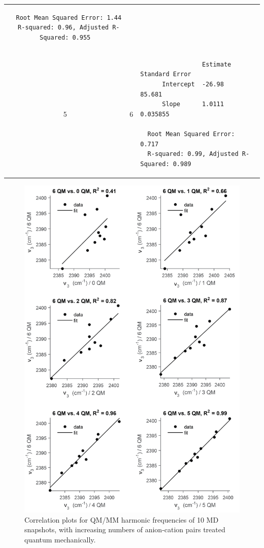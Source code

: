 \documentclass[%
  class = book,%
  crop = false,%
  float = true,%
  multi = true,%
  preview = false,%
]{standalone}
\begin{document}
\begin{table}
\begin{tabular}{ccl}
\begin{minipage}{4.5in}
\begin{verbatim}
  Root Mean Squared Error: 1.44
  R-squared: 0.96, Adjusted R-Squared: 0.955
\end{verbatim}
            \end{minipage} \\
    5 & 6 &
            \begin{minipage}{4.5in}
\begin{verbatim}
                 Estimate   Standard Error
      Intercept  -26.98        85.681
      Slope      1.0111      0.035855

  Root Mean Squared Error: 0.717
  R-squared: 0.99, Adjusted R-Squared: 0.989
\end{verbatim}
            \end{minipage} \\
    \bottomrule
  \end{tabular}
\end{table}

\begin{figure}
  \centering
  \includegraphics[scale=0.85]{figureS5.png}%
  \caption[Self-correlation of QM/MM frequencies with increasing QM region size]{Correlation plots for QM/MM harmonic frequencies of \num{10} MD snapshots, with increasing numbers of anion-cation pairs treated quantum mechanically.}
  \label{paper_02:fig:S5}
\end{figure}

\onlyifstandalone{\printbibliography}
\end{document}
